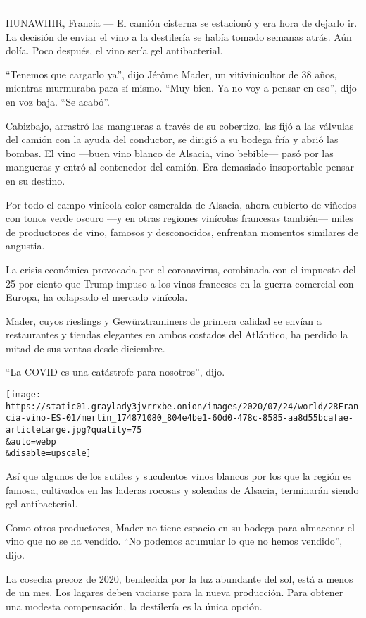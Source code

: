 \begin{center}\rule{0.5\linewidth}{\linethickness}\end{center}

HUNAWIHR, Francia --- El camión cisterna se estacionó y era hora de
dejarlo ir. La decisión de enviar el vino a la destilería se había
tomado semanas atrás. Aún dolía. Poco después, el vino sería gel
antibacterial.

``Tenemos que cargarlo ya'', dijo Jérôme Mader, un vitivinicultor de 38
años, mientras murmuraba para sí mismo. ``Muy bien. Ya no voy a pensar
en eso'', dijo en voz baja. ``Se acabó''.

Cabizbajo, arrastró las mangueras a través de su cobertizo, las fijó a
las válvulas del camión con la ayuda del conductor, se dirigió a su
bodega fría y abrió las bombas. El vino ---buen vino blanco de Alsacia,
vino bebible--- pasó por las mangueras y entró al contenedor del camión.
Era demasiado insoportable pensar en su destino.

Por todo el campo vinícola color esmeralda de Alsacia, ahora cubierto de
viñedos con tonos verde oscuro ---y en otras regiones vinícolas
francesas también--- miles de productores de vino, famosos y
desconocidos, enfrentan momentos similares de angustia.

La crisis económica provocada por el coronavirus, combinada con el
impuesto del 25 por ciento que Trump impuso a los vinos franceses en la
guerra comercial con Europa, ha colapsado el mercado vinícola.

Mader, cuyos rieslings y Gewürztraminers de primera calidad se envían a
restaurantes y tiendas elegantes en ambos costados del Atlántico, ha
perdido la mitad de sus ventas desde diciembre.

``La COVID es una catástrofe para nosotros'', dijo.

\texttt{[image: https://static01.graylady3jvrrxbe.onion/images/2020/07/24/world/28Francia-vino-ES-01/merlin\_174871080\_804e4be1-60d0-478c-8585-aa8d55bcafae-articleLarge.jpg?quality=75\\\&auto=webp\\\&disable=upscale]}

Así que algunos de los sutiles y suculentos vinos blancos por los que la
región es famosa, cultivados en las laderas rocosas y soleadas de
Alsacia, terminarán siendo gel antibacterial.

Como otros productores, Mader no tiene espacio en su bodega para
almacenar el vino que no se ha vendido. ``No podemos acumular lo que no
hemos vendido'', dijo.

La cosecha precoz de 2020, bendecida por la luz abundante del sol, está
a menos de un mes. Los lagares deben vaciarse para la nueva producción.
Para obtener una modesta compensación, la destilería es la única opción.

